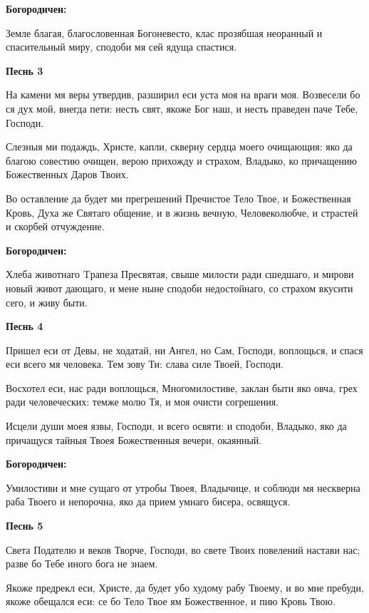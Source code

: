 \medskip
\bfseries Богородичен:\normalfont{}\nopagebreak

Земле благая, благословенная Богоневесто, клас прозябшая неоранный и спасительный миру, сподоби мя сей ядуща спастися.


\medskip
\bfseries Песнь 3\normalfont{}\nopagebreak


На камени мя веры утвердив, разширил еси уста моя на враги моя. Возвесели бо ся дух мой, внегда пети: несть свят, якоже Бог наш, и несть праведен паче Тебе, Господи.


Слезныя ми подаждь, Христе, капли, скверну сердца моего очищающия: яко да благою совестию очищен, верою прихожду и страхом, Владыко, ко причащению Божественных Даров Твоих.


Во оставление да будет ми прегрешений Пречистое Тело Твое, и Божественная Кровь, Духа же Святаго общение, и в жизнь вечную, Человеколюбче, и страстей и скорбей отчуждение.


\medskip
\bfseries Богородичен:\normalfont{}\nopagebreak

Хлеба животнаго Tрапеза Пресвятая, свыше милости ради сшедшаго, и мирови новый живот дающаго, и мене ныне сподоби недостойнаго, со страхом вкусити сего, и живу быти.


\medskip
\bfseries Песнь 4\normalfont{}\nopagebreak


Пришел еси от Девы, не ходатай, ни Ангел, но Сам, Господи, воплощься, и спася еси всего мя человека. Тем зову Ти: слава силе Твоей, Господи.


Восхотел еси, нас ради воплощься, Многомилостиве, заклан быти яко овча, грех ради человеческих: темже молю Тя, и моя очисти согрешения.


Исцели души моея язвы, Господи, и всего освяти: и сподоби, Владыко, яко да причащуся тайныя Твоея Божественныя вечери, окаянный.


\medskip
\bfseries Богородичен:\normalfont{}\nopagebreak

Умилостиви и мне сущаго от утробы Твоея, Владычице, и соблюди мя нескверна раба Твоего и непорочна, яко да прием умнаго бисера, освящуся.


\medskip
\bfseries Песнь 5\normalfont{}\nopagebreak


Света Подателю и веков Творче, Господи, во свете Твоих повелений настави нас; разве бо Тебе иного бога не знаем.


Якоже предрекл еси, Христе, да будет убо худому рабу Твоему, и во мне пребуди, якоже обещался еси: се бо Тело Твое ям Божественное, и пию Кровь Твою.


